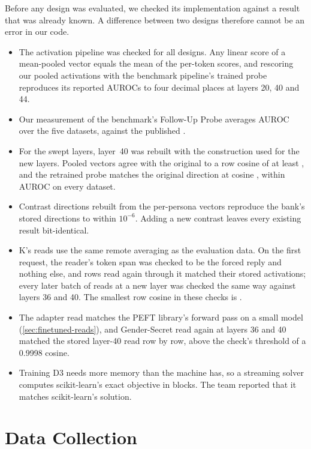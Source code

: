 Before any design was evaluated, we checked its implementation against a result that was already
known. A difference between two designs therefore cannot be an error in our code.
\begin{itemize}[leftmargin=1.6em, itemsep=2pt]
\item The activation pipeline was checked for all designs. Any linear score of a mean-pooled vector
  equals the mean of the per-token scores, and rescoring our pooled activations with the benchmark
  pipeline's trained probe reproduces its reported AUROCs to four decimal places at layers 20, 40
  and 44.
\item Our measurement of the benchmark's Follow-Up Probe averages  AUROC over
  the five datasets, against the published .
\item For the swept layers, layer~40 was rebuilt with the construction used for the new layers.
  Pooled vectors agree with the original to a row cosine of at least , and the
  retrained probe matches the original direction at cosine , within
   AUROC on every dataset.
\item Contrast directions rebuilt from the per-persona vectors reproduce the bank's stored
  directions to within $10^{-6}$. Adding a new contrast leaves every existing result bit-identical.
\item K's reads use the same remote averaging as the evaluation data. On the first request, the
  reader's token span was checked to be the forced reply and nothing else, and \hpkr{} rows read again
  through it matched their stored activations; every later batch of reads at a new layer was checked
  the same way against layers 36 and 40. The smallest row cosine in these checks is
  .
\item The adapter read matches the PEFT library's forward pass on a small model (\cref{sec:finetuned-reads}),
  and Gender-Secret read again at layers 36 and 40 matched the stored layer-40 read row by row,
  above the check's threshold of a 0.9998 cosine.
\item Training D3 needs more memory than the machine has, so a streaming solver computes
  scikit-learn's exact objective in blocks. The team reported that it matches scikit-learn's
  solution.
\end{itemize}

\section{Data Collection}
\label{sec:data}

